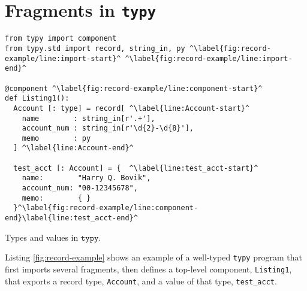 \documentclass[preprint,10pt]{sigplanconf}
\newcommand{\typy}{\texttt{typy}}
\newcommand{\lip}[1]{\lstinline[language=Python,basicstyle=\ttfamily\footnotesize,deletendkeywords={tuple,buffer,map}]{#1}}
\begin{document}

\vspace{-6px}
\section{Fragments in \texttt{typy}}\label{sec:typy-by-example}
\begin{codelisting}[t]
\vspace{-3px}
\begin{lstlisting}
from typy import component
from typy.std import record, string_in, py ^\label{fig:record-example/line:import-start}^ ^\label{fig:record-example/line:import-end}^

@component ^\label{fig:record-example/line:component-start}^
def Listing1():
  Account [: type] = record[ ^\label{line:Account-start}^
    name        : string_in[r'.+'],
    account_num : string_in[r'\d{2}-\d{8}'],
    memo        : py
  ] ^\label{line:Account-end}^

  test_acct [: Account] = {  ^\label{line:test_acct-start}^
    name:        "Harry Q. Bovik",
    account_num: "00-12345678",
    memo:        { }
  }^\label{fig:record-example/line:component-end}\label{line:test_acct-end}^
\end{lstlisting}
\caption{Types and values in $\typy $.}
\label{fig:record-example}
\end{codelisting}

Listing \ref{fig:record-example} shows an example of a well-typed \texttt{typy} program that first imports several fragments, then defines a top-level {component}, \lip{Listing1}, that exports a record type, \lip{Account}, and a value of that type, \lip{test_acct}. 
\end{document}
